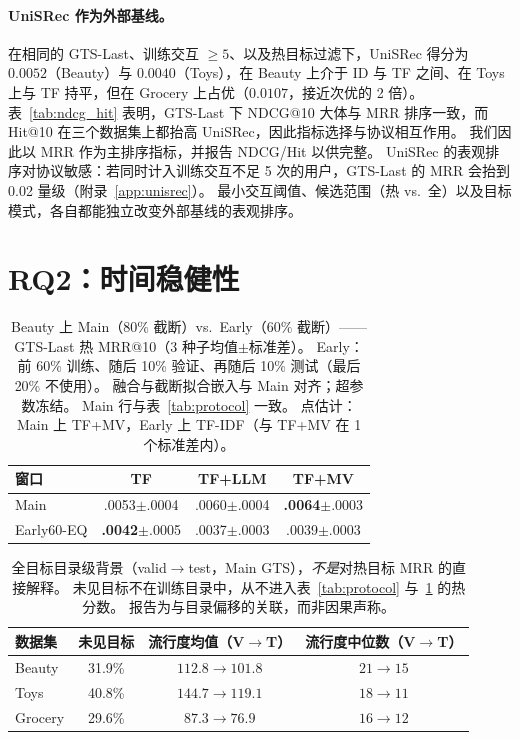 \documentclass[sigconf,natbib=true,anonymous]{acmart}
\newcommand{\tfidf}{\textsc{TF-IDF}\xspace}
\newcommand{\tfmv}{\textsc{TF+MV}\xspace}
\begin{document}
\paragraph{UniSRec 作为外部基线。}
在相同的 GTS-Last、训练交互 $\ge 5$、以及热目标过滤下，UniSRec 得分为 $0.0052$（Beauty）与 $0.0040$（Toys），在 Beauty 上介于 ID 与 TF 之间、在 Toys 上与 TF 持平，但在 Grocery 上占优（$0.0107$，接近次优的 2 倍）。
表~\ref{tab:ndcg_hit} 表明，GTS-Last 下 NDCG@10 大体与 MRR 排序一致，而 Hit@10 在三个数据集上都抬高 UniSRec，因此指标选择与协议相互作用。
我们因此以 MRR 作为主排序指标，并报告 NDCG/Hit 以供完整。
UniSRec 的表观排序对协议敏感：若同时计入训练交互不足 5 次的用户，GTS-Last 的 MRR 会抬到 0.02 量级（附录~\ref{app:unisrec}）。
最小交互阈值、候选范围（热 vs.\ 全）以及目标模式，各自都能独立改变外部基线的表观排序。

\section{RQ2：时间稳健性}
\label{sec:rq2}

\begin{table}[t]
\centering
\caption{%
Beauty 上 Main（$80\%$ 截断）vs.\ Early（$60\%$ 截断）——GTS-Last 热 MRR@10（3 种子均值$\pm$标准差）。
Early：前 60\% 训练、随后 10\% 验证、再随后 10\% 测试（最后 20\% 不使用）。
融合与截断拟合嵌入与 Main 对齐；超参数冻结。
Main 行与表~\ref{tab:protocol} 一致。
点估计：Main 上 \tfmv，Early 上 \tfidf（与 \tfmv 在 1 个标准差内）。%
}
\label{tab:early}
\small
\begin{tabular}{@{}lccc@{}}
\toprule
窗口 & TF & TF+LLM & TF+MV \\
\midrule
Main      & .0053\tiny{$\pm$.0004} & .0060\tiny{$\pm$.0004} & \textbf{.0064}\tiny{$\pm$.0003} \\
Early60-EQ & \textbf{.0042}\tiny{$\pm$.0005} & .0037\tiny{$\pm$.0003} & .0039\tiny{$\pm$.0003} \\
\bottomrule
\end{tabular}
\end{table}

\begin{table}[t]
\centering
\caption{%
全目标目录级背景（valid$\to$test，Main GTS），\emph{不是}对热目标 MRR 的直接解释。
未见目标不在训练目录中，从不进入表~\ref{tab:protocol} 与~\ref{tab:early} 的热分数。
报告为与目录偏移的关联，而非因果声称。%
}
\label{tab:shift}
\small
\setlength{\tabcolsep}{4pt}
\begin{tabular}{@{}lccc@{}}
\toprule
数据集 & 未见目标 & 流行度均值（V$\to$T） & 流行度中位数（V$\to$T） \\
\midrule
Beauty  & 31.9\% & $112.8 \to 101.8$ & $21 \to 15$ \\
Toys    & 40.8\% & $144.7 \to 119.1$ & $18 \to 11$ \\
Grocery & 29.6\% & $87.3 \to 76.9$ & $16 \to 12$ \\
\bottomrule
\end{tabular}
\end{table}
\end{document}
